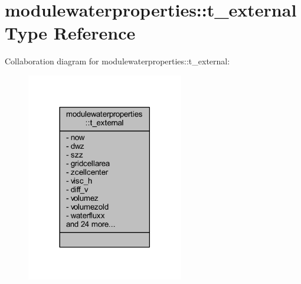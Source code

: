 \hypertarget{structmodulewaterproperties_1_1t__external}{}\section{modulewaterproperties\+:\+:t\+\_\+external Type Reference}
\label{structmodulewaterproperties_1_1t__external}


Collaboration diagram for modulewaterproperties\+:\+:t\+\_\+external\+:\nopagebreak
\begin{figure}[H]
\begin{center}
\leavevmode
\includegraphics[width=194pt]{structmodulewaterproperties_1_1t__external__coll__graph}
\end{center}
\end{figure}
